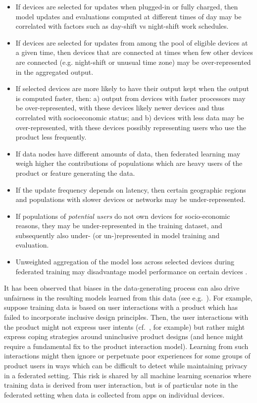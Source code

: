 \documentclass[11pt]{article}
\begin{document}
\begin{itemize}
    \item If devices are selected for updates when plugged-in or fully charged, then model updates and evaluations computed at different times of day may be correlated with factors such as day-shift vs night-shift work schedules.
    \item If devices are selected for updates from among the pool of eligible devices at a given time, then devices that are connected at times when few other devices are connected (e.g. night-shift or unusual time zone) may be over-represented in the aggregated output.
    \item If selected devices are more likely to have their output kept when the output is computed faster, then: a) output from devices with faster processors may be over-represented, with these devices likely newer devices and thus correlated with socioeconomic status; and b) devices with less data may be over-represented, with these devices possibly representing users who use the product less frequently.
    \item If data nodes have different amounts of data, then federated learning may weigh higher the contributions of populations which are heavy users of the product or feature generating the data.
    \item If the update frequency depends on latency, then certain geographic regions and populations with slower devices or networks may be under-represented.
    \item If populations of {\em potential users} do not own devices for socio-economic reasons, they may be under-represented in the training dataset, and subsequently also under- (or un-)represented in model training and evaluation.
    \item Unweighted aggregation of the model loss across selected devices during federated training may disadvantage model performance on certain devices \cite{li2019fair}.
\end{itemize}

It has been observed that biases in the data-generating process can also drive unfairness in the resulting models learned from this data (see e.g.\ \cite{eckhouse2019layers, richardson2019dirty}). For example, suppose training data is based on user interactions with a product which has failed to incorporate inclusive design principles. Then, the user interactions with the product might not express user intents (cf.\ \cite{sambasivan2018privacy}, for example) but rather might express coping strategies
around uninclusive product designs (and hence might require a fundamental fix to the product interaction model). Learning from such interactions might then ignore or perpetuate poor experiences for some groups of product users in ways which can be difficult to detect while maintaining privacy in a federated setting. This risk is shared by all machine learning scenarios where training data is derived from user interaction, but is of particular note in the federated setting when data is collected from apps on individual devices. 
\end{document}
